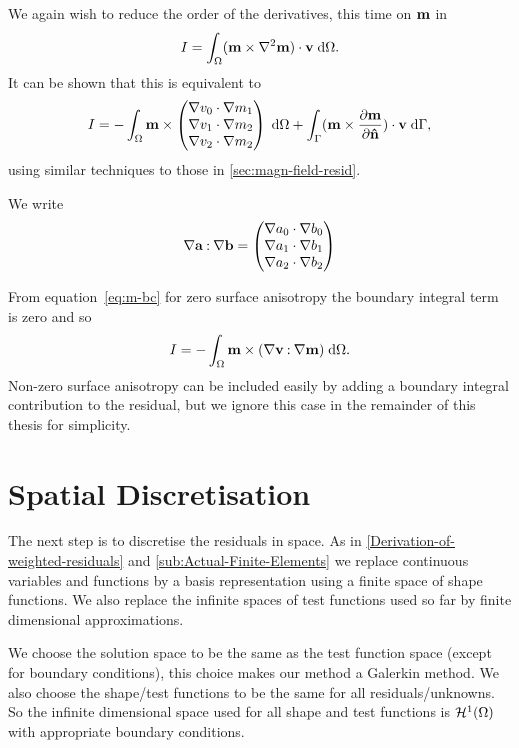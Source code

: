 We again wish to reduce the order of the derivatives, this time on $\mathbf{m}$ in
\begin{equation}
  I = \int_\Omega (\mathbf{m} \times \nabla^2 \mathbf{m}) \cdot \mathbf{v} {\; \text{d}}\Omega.
  \label{eq:46}
\end{equation}
It can be shown that this is equivalent to
\begin{equation}
  \label{eq:49}
  I = - \int_\Omega  \mathbf{m} \times \begin{pmatrix} \nabla v_0 \cdot \nabla m_1 \\ \nabla v_1 \cdot \nabla m_2 \\ \nabla v_2 \cdot \nabla m_2 \end{pmatrix} {\; \text{d}}\Omega 
  + \int_{\Gamma} (\mathbf{m} \times \frac{\partial \mathbf{m}}{\partial \mathbf{\hat{n}}}) \cdot \mathbf{v} {\; \text{d}}{\Gamma},
\end{equation}
using similar techniques to those in \autoref{sec:magn-field-resid}. %

We write 
\begin{equation} 
  \nabla {\mathbf{a}} \mathbin{:} \nabla  {\mathbf{b}}
  =\begin{pmatrix} \nabla a_0 \cdot \nabla  b_0 \\ \nabla a_1 \cdot \nabla b_1 \\ \nabla a_2 \cdot \nabla b_2 \end{pmatrix}
\end{equation}

From equation~\eqref{eq:m-bc} for zero surface anisotropy the boundary integral term is zero and so
\begin{equation}
  I = - \int_\Omega  \mathbf{m} \times {\left( \nabla\mathbf{v}\mathbin{:}\nabla\mathbf{m}\right)} {\; \text{d}}\Omega.
\end{equation}
Non-zero surface anisotropy can be included easily by adding a boundary integral contribution to the residual, but we ignore this case in the remainder of this thesis for simplicity.


\section{Spatial Discretisation}
\label{sec:spat-discr-resi}

The next step is to discretise the residuals in space. As in \autoref{Derivation-of-weighted-residuals} and \ref{sub:Actual-Finite-Elements} we replace continuous variables and functions by a basis representation using a finite space of shape functions. We also replace the infinite spaces of test functions used so far by finite dimensional approximations.

We choose the solution space to be the same as the test function space (except for boundary conditions), this choice makes our method a Galerkin method. We also choose the shape/test functions to be the same for all residuals/unknowns. So the infinite dimensional space used for all shape and test functions is $\mathcal{H}^1(\Omega)$ with appropriate boundary conditions.


